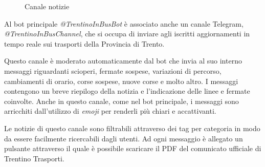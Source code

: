 \begin{wrapfigure}{r}{0.38\textwidth}
\centering
{}
\caption{Canale notizie}
\label{fig:bot-canale-notizie}
\end{wrapfigure}

Al bot principale \textit{@TrentinoInBusBot} è associato anche un canale Telegram, \textit{@TrentinoInBusChannel}, che si occupa di inviare agli iscritti aggiornamenti in tempo reale sui trasporti della Provincia di Trento. 

Questo canale è moderato automaticamente dal bot che invia al suo interno messaggi riguardanti scioperi, fermate sospese, variazioni di percorso, cambiamenti di orario, corse sospese, nuove corse e molto altro. I messaggi contengono un breve riepilogo della notizia e l'indicazione delle linee e fermate coinvolte. Anche in questo canale, come nel bot principale, i messaggi sono arricchiti dall'utilizzo di \textit{emoji} per renderli più chiari e accattivanti.

Le notizie di questo canale sono filtrabili attraverso dei tag per categoria in modo da essere facilmente ricercabili dagli utenti. Ad ogni messaggio è allegato un pulsante attraverso il quale è possibile scaricare il PDF del comunicato ufficiale di Trentino Trasporti.